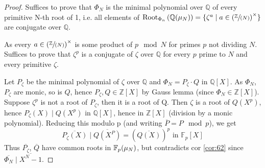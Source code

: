 \begin{proof}
  Suffices to prove that $\Phi_N$ is the minimal polynomial over $\mathbb{Q}$ of every primitive N-th root of 1, i.e. all elements of $\rootset[\Phi_n]{\mathbb{Q}(\unityroots{N})} = \{ \zeta^a \mid a \in \multCyclicGp{N} \}$ are conjugate over $\mathbb{Q}$.

As every $a \in \multCyclicGp{N}$ is some product of $p \mod N$ for primes $p$ not dividing $N$. Suffices to prove that $\zeta^p$ is a conjugate of $\zeta$ over $\mathbb{Q}$ for every $p$ prime to $N$ and every primitive $\zeta$.

Let $P_\zeta$ be the minimal polynomial of $\zeta$ over $\mathbb{Q}$ and $\Phi_N = P_\zeta\cdot{}Q$ in $\mathbb{Q}[X]$. As $\Phi_N$, $P_\zeta$ are monic, so is $Q$, hence $P_\zeta, Q \in \mathbb{Z}[X]$ by Gauss lemma (since $\Phi_N \in \mathbb{Z}[X]$). Suppose $\zeta^p$ is not a root of $P_\zeta$, then it is a root of Q. Then $\zeta$ is a root of $Q(X^p)$, hence $P_\zeta(X) \mid Q(X^p)$ in $\mathbb{Q}[X]$, hence in $\mathbb{Z}[X]$ (division by a monic polynomial). Reducing this modulo p (and writing $\overline{P} = P \mod p$), we get
\[
 \overline{P_\zeta(X)} \mid \overline{Q\left(X^P\right)} = \left(\overline{Q(X)}\right)^p \text{ in } \mathbb{F}_p[X]
\] Thus $\overline{P_\zeta}$, $\overline{Q}$ have common roots in $\mathbb{F}_p(\unityroots{N})$, but contradicts cor \ref{cor:62} since $\overline{\Phi_N} \mid \overline{X^N-1}$. 
\end{proof}


